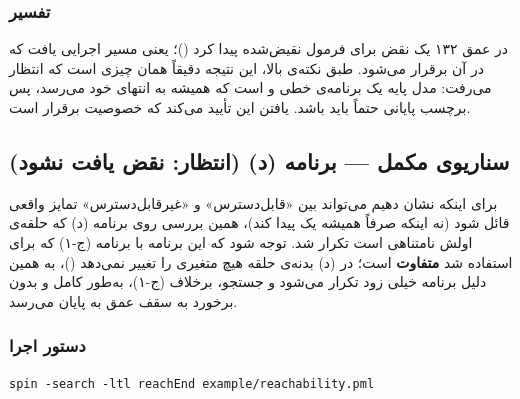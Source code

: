 \documentclass[12pt]{report}
\begin{document}
	\subsubsection{تفسیر}
	 در عمق ۱۳۲ یک نقض برای فرمول نقیض‌شده پیدا کرد ()؛ یعنی مسیر اجرایی یافت که در آن  برقرار می‌شود. طبق نکته‌ی بالا، این نتیجه دقیقاً همان چیزی است که انتظار می‌رفت: مدل پایه یک برنامه‌ی خطی و  است که همیشه به انتهای خود می‌رسد، پس برچسب پایانی حتماً باید  باشد. یافتن این  تأیید می‌کند که خصوصیت  برقرار است.
	
	\subsection{سناریوی مکمل --- برنامه (د) (انتظار: نقض یافت نشود)}
	برای اینکه نشان دهیم  می‌تواند بین «قابل‌دسترس» و «غیرقابل‌دسترس» تمایز واقعی قائل شود (نه اینکه صرفاً همیشه یک  پیدا کند)، همین بررسی روی برنامه (د) که حلقه‌ی اولش نامتناهی است تکرار شد. توجه شود که این برنامه با برنامه (ج-۱) که برای  استفاده شد \textbf{متفاوت} است؛ در (د) بدنه‌ی حلقه هیچ متغیری را تغییر نمی‌دهد ()، به همین دلیل  برنامه خیلی زود تکرار می‌شود و جستجو، برخلاف (ج-۱)، به‌طور کامل و بدون برخورد به سقف عمق به پایان می‌رسد.
	
	\subsubsection{دستور اجرا}
	\begin{latin}
		\begin{lstlisting}[style=codestyle]
			spin -search -ltl reachEnd example/reachability.pml
		\end{lstlisting}
	\end{latin}
	
\end{document}

